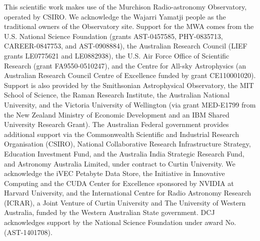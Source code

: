 \documentclass[preprint2,iop,numberedappendix]{emulateapj}
\begin{document}
\acknowledgments

This scientific work makes use of the Murchison Radio-astronomy Observatory, operated by CSIRO. We acknowledge the Wajarri Yamatji people as the traditional owners of the Observatory site. Support for the MWA comes from the U.S. National Science Foundation (grants AST-0457585, PHY-0835713, CAREER-0847753, and AST-0908884), the Australian Research Council (LIEF grants LE0775621 and LE0882938), the U.S. Air Force Office of Scientific Research (grant FA9550-0510247), and the Centre for All-sky Astrophysics (an Australian Research Council Centre of Excellence funded by grant CE110001020). Support is also provided by the Smithsonian Astrophysical Observatory, the MIT School of Science, the Raman Research Institute, the Australian National University, and the Victoria University of Wellington (via grant MED-E1799 from the New Zealand Ministry of Economic Development and an IBM Shared University Research Grant). The Australian Federal government provides additional support via the Commonwealth Scientific and Industrial Research Organisation (CSIRO), National Collaborative Research Infrastructure Strategy, Education Investment Fund, and the Australia India Strategic Research Fund, and Astronomy Australia Limited, under contract to Curtin University. We acknowledge the iVEC Petabyte Data Store, the Initiative in Innovative Computing and the CUDA Center for Excellence sponsored by NVIDIA at Harvard University, and the International Centre for Radio Astronomy Research (ICRAR), a Joint Venture of Curtin University and The University of Western Australia, funded by the Western Australian State government. DCJ acknowledges support by the National Science Foundation under award No. (AST-1401708).

\par\bigskip


\end{document}
